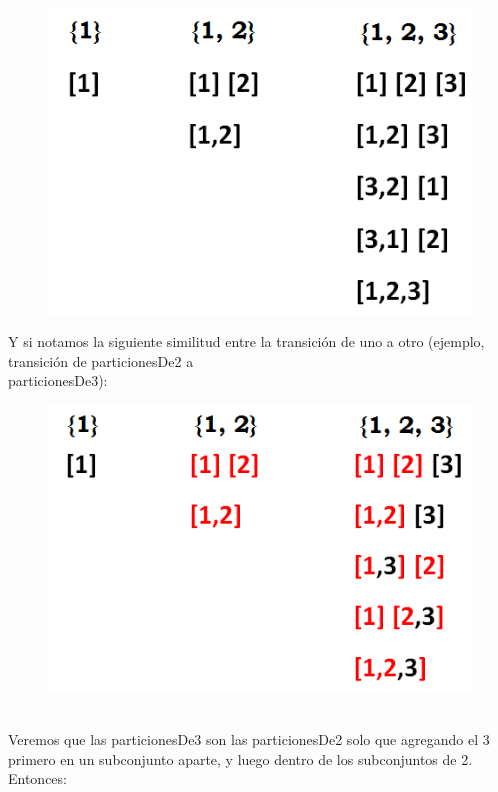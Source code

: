 \documentclass[10pt,a4paper]{article}
\begin{document}
\begin{figure}[h]
	\begin{center}
	   \includegraphics[scale=0.7]{ParticionesNegro.png}
	\end{center}
\end{figure}
Y si notamos la siguiente similitud entre la transición de uno a otro (ejemplo, transición de particionesDe2 a \\particionesDe3):\\
\begin{figure}[h]
	\begin{center}
	   \includegraphics[scale=0.7]{ParticionesNegroRojo.png}
	\end{center}
\end{figure}\\
Veremos que las particionesDe3 son las particionesDe2 solo que agregando el 3  primero en un subconjunto aparte, y luego dentro de los subconjuntos de 2. Entonces:
\end{document}
